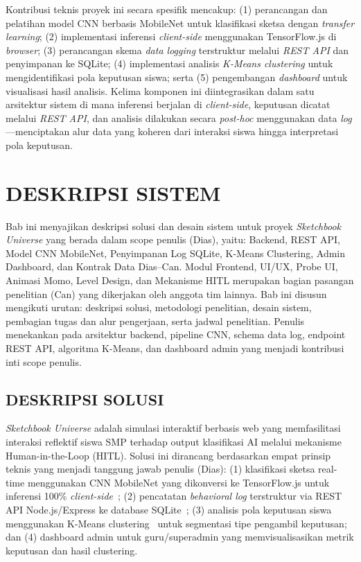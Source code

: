 \documentclass[12pt,a4paper,oneside,openany]{report}
\begin{document}
Kontribusi teknis proyek ini secara spesifik mencakup: (1) perancangan dan pelatihan model CNN berbasis MobileNet untuk klasifikasi sketsa dengan \textit{transfer learning}; (2) implementasi inferensi \textit{client-side} menggunakan TensorFlow.js di \textit{browser}; (3) perancangan skema \textit{data logging} terstruktur melalui \textit{REST API} dan penyimpanan ke SQLite; (4) implementasi analisis \textit{K-Means clustering} untuk mengidentifikasi pola keputusan siswa; serta (5) pengembangan \textit{dashboard} untuk visualisasi hasil analisis. Kelima komponen ini diintegrasikan dalam satu arsitektur sistem di mana inferensi berjalan di \textit{client-side}, keputusan dicatat melalui \textit{REST API}, dan analisis dilakukan secara \textit{post-hoc} menggunakan data \textit{log}---menciptakan alur data yang koheren dari interaksi siswa hingga interpretasi pola keputusan.

\chapter{DESKRIPSI SISTEM}
\label{chap:bab3}

Bab ini menyajikan deskripsi solusi dan desain sistem untuk proyek \textit{Sketchbook Universe} yang berada dalam scope penulis (Dias), yaitu: Backend, REST API, Model CNN MobileNet, Penyimpanan Log SQLite, K-Means Clustering, Admin Dashboard, dan Kontrak Data Dias--Can. Modul Frontend, UI/UX, Probe UI, Animasi Momo, Level Design, dan Mekanisme HITL merupakan bagian pasangan penelitian (Can) yang dikerjakan oleh anggota tim lainnya. Bab ini disusun mengikuti urutan: deskripsi solusi, metodologi penelitian, desain sistem, pembagian tugas dan alur pengerjaan, serta jadwal penelitian. Penulis menekankan pada arsitektur backend, pipeline CNN, schema data log, endpoint REST API, algoritma K-Means, dan dashboard admin yang menjadi kontribusi inti scope penulis.

\section{DESKRIPSI SOLUSI}
\label{sec:deskripsi-solusi}

\textit{Sketchbook Universe} adalah simulasi interaktif berbasis web yang memfasilitasi interaksi reflektif siswa SMP terhadap output klasifikasi AI melalui mekanisme Human-in-the-Loop (HITL). Solusi ini dirancang berdasarkan empat prinsip teknis yang menjadi tanggung jawab penulis (Dias): (1) klasifikasi sketsa real-time menggunakan CNN MobileNet yang dikonversi ke TensorFlow.js untuk inferensi 100\% \textit{client-side}~\cite{ref6}\cite{ref7}\cite{ref8}; (2) pencatatan \textit{behavioral log} terstruktur via REST API Node.js/Express ke database SQLite~\cite{ref4}; (3) analisis pola keputusan siswa menggunakan K-Means clustering~\cite{ref10}\cite{ref11} untuk segmentasi tipe pengambil keputusan; dan (4) dashboard admin untuk guru/superadmin yang memvisualisasikan metrik keputusan dan hasil clustering.
\end{document}
